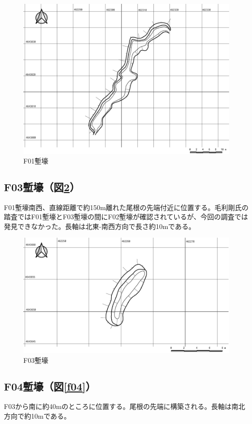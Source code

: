 \documentclass[14Q]{jsarticle}
\begin{document}
\begin{figure}[h]
\centering
\includegraphics[width=160truemm]{fig/F01.pdf}
\caption{F01塹壕}
\label{f01}
\end{figure}

\subsection{F03塹壕（図\ref{f03}）}
F01塹壕南西、直線距離で約150m離れた尾根の先端付近に位置する。毛利剛氏の踏査ではF01塹壕とF03塹壕の間にF02塹壕が確認されているが、今回の調査では発見できなかった。長軸は北東-南西方向で長さ約10mである。

\begin{figure}[h]
\centering
\includegraphics[width=160truemm]{fig/F03.pdf}
\caption{F03塹壕}
\label{f03}
\end{figure}

\subsection{F04塹壕（図\ref{f04}）}
F03から南に約40mのところに位置する。尾根の先端に構築される。長軸は南北方向で約10mである。
\end{document}

